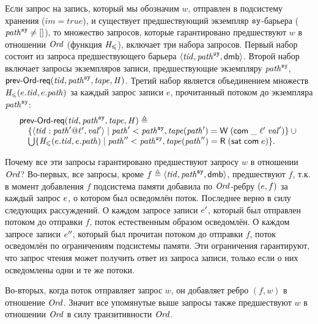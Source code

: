 Если запрос на запись, который мы обозначим $w$,
отправлен в подсистему хранения ($im = \mathit{true}$),
и существует предшествующий экземпляр $\mathtt{sy}$-барьера ($\mathit{path}^{\mathtt{sy}} \neq []$),
то множество запросов, которые гарантировано предшествуют $w$ в отношении $\mathit{Ord}$
(функция $\mathit{H}_{\leqslant}$), включает три набора запросов.
Первый набор состоит из запроса предшествующего барьера $\langle \mathit{tid}, \mathit{path}^{\mathtt{sy}}, {\sf dmb} \rangle$.
Второй набор включает запросы экземпляров записи, предшествующие экземпляру $\mathit{path}^{\mathtt{sy}}$,
$\textup{\sf prev-Ord-req}(\mathit{tid}, \mathit{path}^{\mathtt{sy}}, \mathit{tape}, \mathit{H})$.
Третий набор является объединением множеств $\mathit{H}_{\leqslant}(e.\mathit{tid}, e.\mathit{path})$ за каждый запрос записи $e$,
прочитанный потоком до экземпляра $\mathit{path}^{\mathtt{sy}}$:
\[\begin{array}{l}
\textup{\sf prev-Ord-req}(\mathit{tid}, \mathit{path}^{\mathtt{sy}}, \mathit{tape}, \mathit{H}) \triangleq\\
\quad \{ \langle \mathit{tid}:\mathit{path}'@\ell',\mathit{val}' \rangle \mid \mathit{path}'  < \mathit{path}^{\mathtt{sy}},
          \mathit{tape}(\mathit{path}' ) = \textsf{W} \; (\mathsf{com} \; \_ \; \ell' \; \mathit{val}') \} \cup {}\\
\quad \bigcup \{ \mathit{H}_{\leqslant}(e.\mathit{tid}, e.\mathit{path}) \mid
                   \mathit{path}'' < \mathit{path}^{\mathtt{sy}}, \mathit{tape}(\mathit{path}'') = \textsf{R} \; (\mathsf{sat} \; \mathsf{com} \; e) \}. 
\end{array}\]

Почему все эти запросы гарантировано предшествуют запросу $w$ в отношении $\mathit{Ord}$?
Во-первых, все запросы, кроме $f \triangleq \langle \mathit{tid}, \mathit{path}^{\mathtt{sy}}, {\sf dmb} \rangle$, предшествуют $f$,
т.к. в момент добавления $f$ подсистема памяти добавила по $\mathit{Ord}$-ребру $(e, f)$ за
каждый запрос $e$, о котором был осведомлён поток.
Последнее верно в силу следующих рассуждений.
О каждом запросе записи $e'$, который был отправлен потоком до отправки $f$,
поток естественным образом осведомлён.
О каждом запросе записи $e''$, который был прочитан потоком до отправки $f$,
поток осведомлён по ограничениям подсистемы памяти.
Эти ограничения гарантируют, что запрос чтения может получить ответ из
запроса записи, только если о них осведомлены одни и те же потоки.

Во-вторых, когда поток отправляет запрос $w$, он добавляет ребро $(f, w)$ в отношение $\mathit{Ord}$.
Значит все упомянутые выше запросы также предшествуют $w$ в отношении $\mathit{Ord}$
в силу транзитивности $\mathit{Ord}$.


